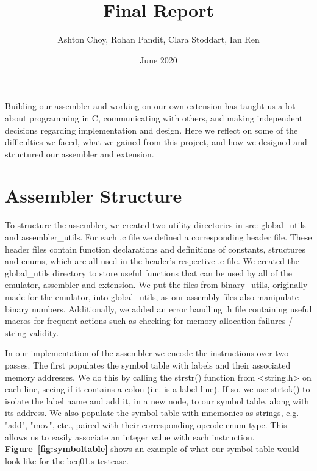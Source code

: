 \documentclass[11pt]{article}
\begin{document}
\title{Final Report}
\author{Ashton Choy, Rohan Pandit, Clara Stoddart, Ian Ren }
\date{June 2020}

\maketitle

Building our assembler and working on our own extension has taught us a lot about programming in C, communicating with others, and making independent decisions regarding implementation and design. Here we reflect on some of the difficulties we faced, what we gained from this project, and how we designed and structured our assembler and extension.

\section*{Assembler Structure}
To structure the assembler, we created two utility directories in src: global\_utils and assembler\_utils. For each .c file we defined a corresponding header file. These header files contain function declarations and definitions of constants, structures and enums, which are all used in the header's respective .c file. 
We created the global\_utils directory to store useful functions that can be used by all of the emulator, assembler and extension. We put the files from binary\_utils, originally made for the emulator, into global\_utils, as our assembly files also manipulate binary numbers. Additionally, we added an error handling .h file containing useful macros for frequent actions such as checking for memory allocation failures / string validity. 

In our implementation of the assembler we encode the instructions over two passes. The first populates the symbol table with labels and their associated memory addresses. We do this by calling the strstr() function from <string.h> on each line, seeing if it contains a colon (i.e. is a label line). If so, we use strtok() to isolate the label name and add it, in a new node, to our symbol table, along with its address. We also populate the symbol table with mnemonics as strings, e.g. "add", "mov", etc.,  paired with their corresponding opcode enum type. This allows us to easily associate an integer value with each instruction. \textbf{Figure~\ref{fig:symboltable}} shows an example of what our symbol table would look like for the beq01.s testcase.
\end{document}
